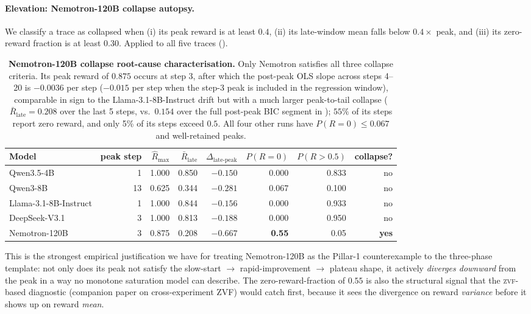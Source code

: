 \paragraph{Elevation: Nemotron-120B collapse autopsy.}
\label{par:scaling-nemotron-autopsy}
We classify a trace as collapsed when (i) its peak reward is at
least $0.4$, (ii) its late-window mean falls below $0.4 \times$
peak, and (iii) its zero-reward fraction is at least $0.30$.
Applied to all five traces ().

\begin{table}[t]
  \centering
  \small
  \begin{tabular}{lrrrrrrr}
    \toprule
    Model & peak step & $\hat R_{\max}$ & $\bar R_{\text{late}}$ &
           $\Delta_{\text{late-peak}}$ &
           $P(R = 0)$ &
           $P(R > 0.5)$ & collapse? \\
    \midrule
    Qwen3.5-4B            &  1 & 1.000 & 0.850 & $-0.150$ & 0.000 & 0.833 & no \\
    Qwen3-8B              & 13 & 0.625 & 0.344 & $-0.281$ & 0.067 & 0.100 & no \\
    Llama-3.1-8B-Instruct &  1 & 1.000 & 0.844 & $-0.156$ & 0.000 & 0.933 & no \\
    DeepSeek-V3.1         &  3 & 1.000 & 0.813 & $-0.188$ & 0.000 & 0.950 & no \\
    Nemotron-120B         &  3 & 0.875 & 0.208 & $\mathbf{-0.667}$ & \textbf{0.55} & 0.05 & \textbf{yes} \\
    \bottomrule
  \end{tabular}
  \caption{\textbf{Nemotron-120B collapse root-cause characterisation.}
    Only Nemotron satisfies all three collapse criteria.  Its peak
    reward of $0.875$ occurs at step 3, after which the post-peak
    OLS slope across steps 4--20 is $-0.0036$ per step ($-0.015$ per
    step when the step-3 peak is included in the regression window),
    comparable in sign to the Llama-3.1-8B-Instruct drift but with a
    much larger peak-to-tail collapse ($\bar R_{\text{late}} = 0.208$
    over the last 5 steps, vs.~$0.154$ over the full post-peak BIC
    segment in ); $55\%$ of its
    steps report zero reward, and only 5\% of its steps exceed $0.5$.
    All four other runs have $P(R = 0) \le 0.067$ and well-retained peaks.}
  \label{tab:scaling-nemotron-autopsy}
\end{table}

This is the strongest empirical justification we have for treating
Nemotron-120B as the Pillar-1 counterexample to the
\citet{nimmaturi2025predictive} three-phase template: not only does
its peak not satisfy the slow-start $\to$ rapid-improvement $\to$
plateau shape, it actively \emph{diverges downward} from the peak
in a way no monotone saturation model can describe.  The
zero-reward-fraction of $0.55$ is also the structural signal that
the \textsc{zvf}-based diagnostic
(companion paper on cross-experiment ZVF) would catch first, because it
sees the divergence on reward \emph{variance} before it shows up on
reward \emph{mean}.

